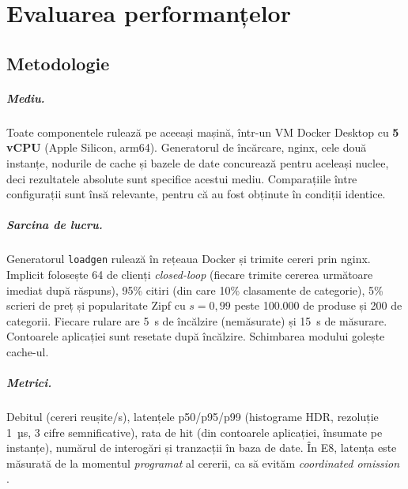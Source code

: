 \chapter{Evaluarea performanțelor}
\label{ch:evaluare}

\section{Metodologie}

\paragraph{Mediu.} Toate componentele rulează pe aceeași mașină, într-un VM Docker Desktop cu
\textbf{5 vCPU} (Apple Silicon, arm64). Generatorul de încărcare, nginx, cele două instanțe, nodurile de
cache și bazele de date concurează pentru aceleași nuclee, deci rezultatele absolute sunt specifice
acestui mediu. Comparațiile între configurații sunt însă relevante, pentru că au fost obținute în
condiții identice.

\paragraph{Sarcina de lucru.} Generatorul \texttt{loadgen} rulează în rețeaua Docker și trimite cereri
prin nginx. Implicit folosește 64 de clienți \emph{closed-loop} (fiecare trimite cererea următoare
imediat după răspuns), 95\% citiri (din care 10\% clasamente de categorie), 5\% scrieri de preț și
popularitate Zipf cu $s = 0{,}99$ peste 100.000 de produse și 200 de categorii. Fiecare rulare are 5~s
de încălzire (nemăsurate) și 15~s de măsurare. Contoarele aplicației sunt resetate după încălzire.
Schimbarea modului golește cache-ul.

\paragraph{Metrici.} Debitul (cereri reușite/s), latențele p50/p95/p99 (histograme HDR, rezoluție 1~µs,
3 cifre semnificative), rata de hit (din contoarele aplicației, însumate pe instanțe), numărul de
interogări și tranzacții în baza de date. În E8, latența este măsurată de la momentul \emph{programat}
al cererii, ca să evităm \emph{coordinated omission} \cite{tene}.

